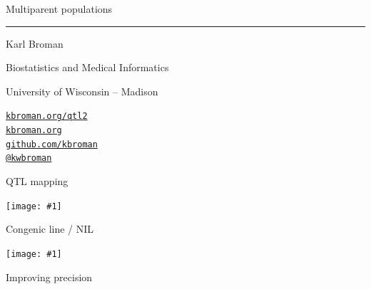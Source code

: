 \documentclass[12pt]{article}
\newcommand{\titlesize}{\fontsize{40}{50} \selectfont}
\newcommand{\headsize}{\fontsize{35}{35} \selectfont}
\newcommand{\textsize}{\fontsize{30}{35} \selectfont}
\newcommand{\smallsize}{\fontsize{25}{30} \selectfont}
\newcommand{\figh}[2]{\centerline{\texttt{[image: \#1]}}}
\newcommand{\figw}[2]{\centerline{\texttt{[image: \#1]}}}
\begin{document}
\thispagestyle{empty}

\begin{center}
\titlesize \color{myyellow}


\vspace*{15mm}

Multiparent populations

\color{mypink}
\rule{10in}{1mm}

\vspace{5mm}

\textsize \color{myblue}
Karl Broman
\vspace{5mm}

\color{mywhite}
{\smallsize Biostatistics and Medical Informatics

University of Wisconsin -- Madison
\vspace{20mm}


\href{http://kbroman.org/qtl2}{\tt kbroman.org/qtl2} \\[3pt]
\href{http://kbroman.org}{\tt kbroman.org} \\[3pt]
\href{https://github.com/kbroman}{\tt github.com/kbroman} \\
\href{https://twitter.com/kwbroman}{\tt @kwbroman} \\
}

\end{center}



\newpage


\headsize \color{myyellow}
\hfill \begin{minipage}{5.75in}
\centering
QTL mapping
\end{minipage}

\vspace{5mm}

\figh{Figs/lodcurve_insulin_with_effects.pdf}{0.9}

\newpage


\headsize \color{myyellow}
\hfill \begin{minipage}{5.75in}
\centering
Congenic line / NIL
\end{minipage}


\figw{Figs/congenic.pdf}{1.0}

\newpage



\headsize \color{myyellow}
\hfill \begin{minipage}{5.75in}
\centering
Improving precision
\end{minipage}


\vspace{3cm}
\end{document}

